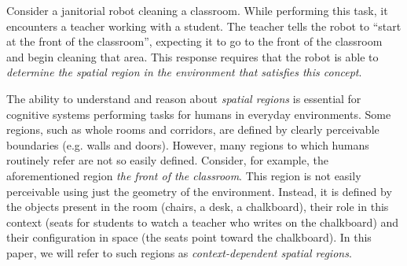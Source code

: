 \documentclass[letterpaper]{article}
\begin{document}
Consider a janitorial robot cleaning a classroom. While performing this task, it encounters a teacher working with a student. The teacher tells the robot to ``start at the front of the classroom'', expecting it to go to the front of the classroom and begin cleaning that area. This response requires that the robot is able to \emph{determine the spatial region in the environment that satisfies this concept}.

The ability to understand and reason about \textit{spatial regions} is essential for cognitive systems performing tasks for humans in everyday environments. Some regions, such as whole rooms and corridors, are defined by clearly perceivable boundaries (e.g. walls and doors). However, many regions to which humans routinely refer are not so easily defined. Consider, for example, the aforementioned region \textit{the front of the classroom}. This region is not easily perceivable using just the geometry of the environment. Instead, it is defined by the objects present in the room (chairs, a desk, a chalkboard), their role in this context (seats for students to watch a teacher who writes on the chalkboard) and their configuration in space (the seats point toward the chalkboard). In this paper, we will refer to such regions as \textit{context-dependent spatial regions}. 

\end{document}
